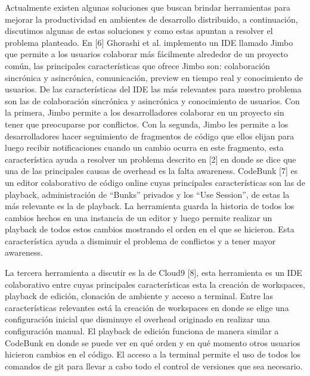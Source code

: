 Actualmente existen algunas soluciones que buscan brindar herramientas para mejorar la productividad en ambientes de desarrollo distribuido, a continuación, discutimos algunas de estas soluciones y como estas apuntan a resolver el problema planteado. En [6] Ghorashi et al. implemento un IDE llamado Jimbo que permite a los usuarios colaborar más fácilmente alrededor de un proyecto común, las principales características que ofrece Jimbo son: colaboración sincrónica y asincrónica, comunicación, preview en tiempo real y conocimiento de usuarios. De las características del IDE las más relevantes para nuestro problema son las de colaboración sincrónica y asincrónica y conocimiento de usuarios. Con la primera, Jimbo permite a los desarrolladores colaborar en un proyecto sin tener que preocuparse por conflictos. Con la segunda, Jimbo les permite a los desarrolladores hacer seguimiento de fragmentos de código que ellos elijan para luego recibir notificaciones cuando un cambio ocurra en este fragmento, esta característica ayuda a resolver un problema descrito en [2] en donde se dice que una de las principales causas de overhead es la falta awareness. CodeBunk [7] es un editor colaborativo de código online cuyas principales características son las de playback, administración de “Bunks” privados y los “Use Session”, de estas la más relevante es la de playback. La herramienta guarda la historia de todos los cambios hechos en una instancia de un editor y luego permite realizar un playback de todos estos cambios mostrando el orden en el que se hicieron. Esta característica ayuda a disminuir el problema de conflictos y a tener mayor awareness. 

La tercera herramienta a discutir es la de Cloud9 [8], esta herramienta es un IDE colaborativo entre cuyas principales características esta la creación de workspaces, playback de edición, clonación de ambiente y acceso a terminal. Entre las características relevantes está la creación de workspaces en donde se elige una configuración inicial que disminuye el overhead originado en realizar una configuración manual. El playback de edición funciona de manera similar a CodeBunk en donde se puede ver en qué orden y en qué momento otros usuarios hicieron cambios en el código. El acceso a la terminal permite el uso de todos los comandos de git para llevar a cabo todo el control de versiones que sea necesario.